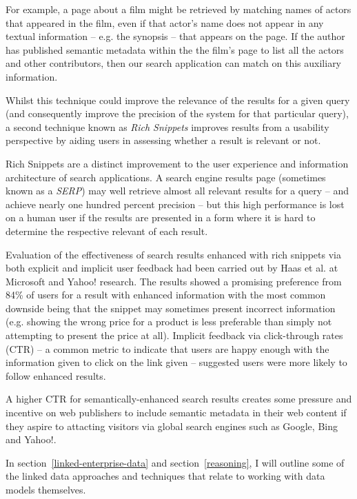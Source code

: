 For example, a page about a film might be retrieved
by matching names of actors that appeared in the film, even if that actor's
name does not appear in any textual information -- e.g. the synopsis --
that appears on the page. If the author has published semantic metadata
within the the film's page to list all the actors and other contributors,
then our search application can match on this auxiliary information.

Whilst this technique could improve the relevance of the results for a
given query (and consequently improve the precision of the system for that
particular query), a second technique known as \emph{Rich Snippets} improves
results from a usability perspective by aiding users in assessing whether
a result is relevant or not.

Rich Snippets are a distinct improvement 
to the user experience and information architecture
of search applications. A search engine results page (sometimes known as a
\emph{SERP}) may well retrieve almost all relevant results for a query -- and
achieve nearly one hundred percent precision -- but this high performance
is lost on a human user if the results are presented in a form where it is
hard to determine the respective relevant of each result.

Evaluation of the effectiveness of search results enhanced with rich snippets
via both explicit and implicit user feedback had been carried out by
Haas et al.\cite{haas2011enhanced} at Microsoft and Yahoo! research. The
results showed a promising preference from 84\% of users for a result
with enhanced information with the most common downside being that the
snippet may sometimes present incorrect information (e.g. showing the wrong
price for a product is less preferable than simply not attempting to present
the price at all). Implicit feedback via click-through rates (CTR) --
a common metric to indicate that users are happy enough with the information
given to click on the link given -- suggested users were more likely to
follow enhanced results.

A higher CTR for semantically-enhanced search results creates some pressure
and incentive on web publishers to include semantic metadata in their web
content if they aspire to attacting visitors via global search engines such
as Google, Bing and Yahoo!.

In section~\ref{linked-enterprise-data} and section~\ref{reasoning}, I will
outline some of the linked data approaches and techniques that relate to
working with data models themselves.

